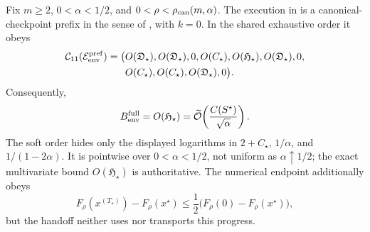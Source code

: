 \begin{theorem}
\label{thm:branch-caterpillar-envelope-aesp-prefix}
Fix $m\geq2$, $0<\alpha<1/2$, and
$0<\rho<\rho_{\rm can}(m,\alpha)$.  The execution in
 is a
canonical-checkpoint prefix in the sense of
, with $k=0$.  In the
shared exhaustive order it obeys
\begin{equation}
 \begin{aligned}
 \mathcal C_{11}(\mathcal E_{\rm env}^{\rm pref})
 =\bigl(&O(\mathfrak D_\star),O(\mathfrak D_\star),0,O(C_\star),
 O(\mathfrak H_\star),O(\mathfrak D_\star),0,\\
 &O(C_\star),O(C_\star),O(\mathfrak D_\star),0\bigr).
 \end{aligned}
 \label{eq:branch-caterpillar-envelope-aesp-prefix-eleven-vector}
\end{equation}
Consequently,
\begin{equation}
 B_{\rm env}^{\rm full}
 =O(\mathfrak H_\star)
 =\widetilde{\mathcal{O}}\!\left(\frac{C(S^\star)}{\sqrt\alpha}\right).
 \label{eq:branch-caterpillar-envelope-aesp-prefix-work}
\end{equation}
The soft order hides only the displayed logarithms in $2+C_\star$,
$1/\alpha$, and $1/(1-2\alpha)$.  It is pointwise over
$0<\alpha<1/2$, not uniform as $\alpha\uparrow1/2$; the exact multivariate
bound $O(\mathfrak H_\star)$ is authoritative.  The numerical endpoint
additionally obeys
\begin{equation}
 F_\rho(x^{(T_\star)})-F_\rho(x^\star)
 \leq\frac12\bigl(F_\rho(0)-F_\rho(x^\star)\bigr),
 \label{eq:branch-caterpillar-envelope-aesp-half-gap}
\end{equation}
but the handoff neither uses nor transports this progress.
\end{theorem}

